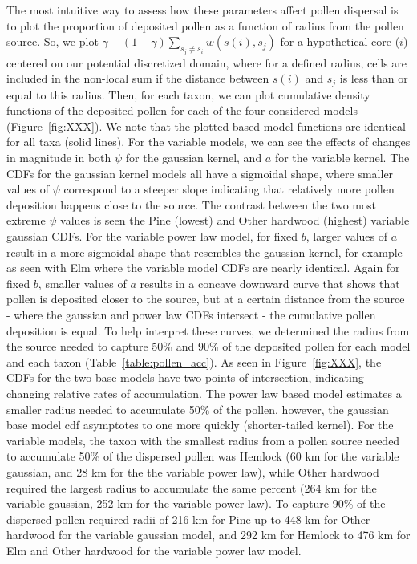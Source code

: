 \documentclass[12pt]{article}
\begin{document}
The most intuitive way to assess how these parameters affect pollen
dispersal is to plot the proportion of deposited pollen as a function
of radius from the pollen source. So, we plot $\gamma + (1- \gamma)
\sum_{s_j \neq s_i} w(s(i), s_j)$ for a hypothetical core ($i$)
centered on our potential discretized domain, where for a defined
radius, cells are included in the non-local sum if the distance
between $s(i)$ and $s_j$ is less than or equal to this radius. Then,
for each taxon, we can plot cumulative density functions of the
deposited pollen for each of the four considered models
(Figure~\ref{fig:XXX}). We note that the plotted based model functions
are identical for all taxa (solid lines).  For the variable models, we
can see the effects of changes in magnitude in both $\psi$ for the
gaussian kernel, and $a$ for the variable kernel. The CDFs for the
gaussian kernel models all have a sigmoidal shape, where smaller
values of $\psi$ correspond to a steeper slope indicating that
relatively more pollen deposition happens close to the source. The
contrast between the two most extreme $\psi$ values is seen the Pine
(lowest) and Other hardwood (highest) variable gaussian CDFs. For the
variable power law model, for fixed $b$, larger values of $a$ result
in a more sigmoidal shape that resembles the gaussian kernel, for
example as seen with Elm where the variable model CDFs are nearly
identical. Again for fixed $b$, smaller values of $a$ results in a
concave downward curve that shows that pollen is deposited closer to
the source, but at a certain distance from the source - where the
gaussian and power law CDFs intersect - the cumulative pollen
deposition is equal. To help interpret these curves, we determined the
radius from the source needed to capture 50\% and 90\% of the
deposited pollen for each model and each taxon
(Table~\ref{table:pollen_acc}). As seen in Figure~\ref{fig:XXX}, the
CDFs for the two base models have two points of intersection,
indicating changing relative rates of accumulation. The power law
based model estimates a smaller radius needed to accumulate 50\% of
the pollen, however, the gaussian base model cdf asymptotes to one
more quickly (shorter-tailed kernel). For the variable models, the
taxon with the smallest radius from a pollen source needed to
accumulate 50\% of the dispersed pollen was Hemlock (60 km for the
variable gaussian, and 28 km for the the variable power law), while
Other hardwood required the largest radius to accumulate the same
percent (264 km for the variable gaussian, 252 km for the variable
power law). To capture 90\% of the dispersed pollen required radii of
216 km for Pine up to 448 km for Other hardwood for the variable
gaussian model, and 292 km for Hemlock to 476 km for Elm and Other
hardwood for the variable power law model.
\end{document}
